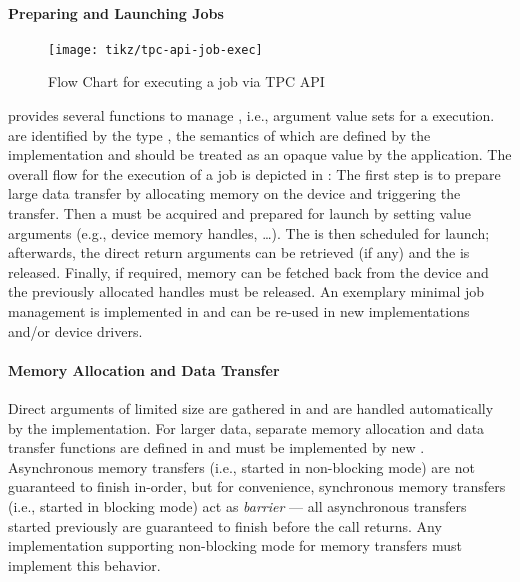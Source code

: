 \paragraph{Preparing and Launching Jobs}
%
\begin{figure}
  \centering\texttt{[image: tikz/tpc-api-job-exec]}
  \caption{Flow Chart for executing a job via TPC API}
  \label{fig:tpc-api-job-exec}
\end{figure}
%
 provides several functions to manage , i.e., argument value sets for a  execution.
 are identified by the type , the semantics of which are defined by the  implementation and should be treated as an opaque value by the application.
The overall flow for the execution of a job is depicted in :
The first step is to prepare large data transfer by allocating memory on the device and triggering the transfer.
Then a  must be acquired and prepared for launch by setting value arguments (e.g., device memory handles, \ldots).
The  is then scheduled for launch; afterwards, the direct return arguments can be retrieved (if any) and the  is released.
Finally, if required, memory can be fetched back from the device and the previously allocated handles must be released.
An exemplary minimal job management is implemented in  and can be re-used in new implementations and/or device drivers.

\paragraph{Memory Allocation and Data Transfer}
Direct  arguments of limited size are gathered in  and are handled automatically by the  implementation.
For larger data, separate memory allocation and data transfer functions are defined in  and must be implemented by new .
Asynchronous memory transfers (i.e., started in non-blocking mode) are not guaranteed to finish in-order, but for convenience, synchronous memory transfers (i.e., started in blocking mode) act as \emph{barrier} --- all asynchronous transfers started previously are guaranteed to finish before the call returns.
Any  implementation supporting non-blocking mode for memory transfers must implement this behavior.


